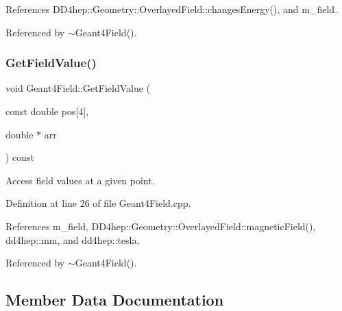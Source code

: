 References D\+D4hep\+::\+Geometry\+::\+Overlayed\+Field\+::changes\+Energy(), and m\+\_\+field.



Referenced by $\sim$\+Geant4\+Field().

\hypertarget{class_d_d4hep_1_1_simulation_1_1_geant4_field_ab1c27bc8b1ee450441ee30f52dd27cff}{}\label{class_d_d4hep_1_1_simulation_1_1_geant4_field_ab1c27bc8b1ee450441ee30f52dd27cff} 
\subsubsection{\texorpdfstring{Get\+Field\+Value()}{GetFieldValue()}}
{\footnotesize\ttfamily void Geant4\+Field\+::\+Get\+Field\+Value (\begin{DoxyParamCaption}\item[{const double}]{pos\mbox{[}4\mbox{]},  }\item[{double $\ast$}]{arr }\end{DoxyParamCaption}) const\hspace{0.3cm}{\ttfamily [virtual]}}



Access field values at a given point. 



Definition at line 26 of file Geant4\+Field.\+cpp.



References m\+\_\+field, D\+D4hep\+::\+Geometry\+::\+Overlayed\+Field\+::magnetic\+Field(), dd4hep\+::mm, and dd4hep\+::tesla.



Referenced by $\sim$\+Geant4\+Field().



\subsection{Member Data Documentation}
\hypertarget{class_d_d4hep_1_1_simulation_1_1_geant4_field_a453c3e707d5f019ef541b449c80100ae}{}\label{class_d_d4hep_1_1_simulation_1_1_geant4_field_a453c3e707d5f019ef541b449c80100ae} 
